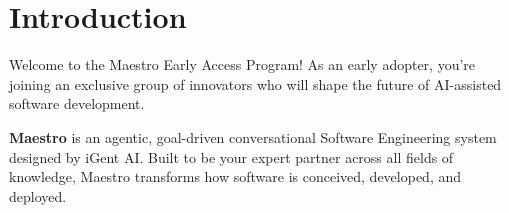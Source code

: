 \section*{\color{maestroBlue}Introduction}

Welcome to the Maestro Early Access Program! As an early adopter, you're joining an exclusive group of innovators who will shape the future of AI-assisted software development.

\textbf{Maestro} is an agentic, goal-driven conversational Software Engineering system designed by iGent AI. Built to be your expert partner across all fields of knowledge, Maestro transforms how software is conceived, developed, and deployed.